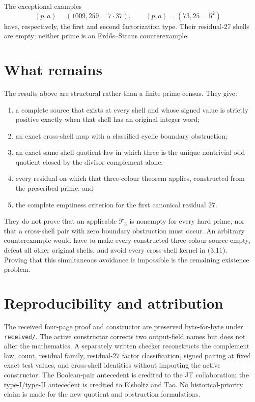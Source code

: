 The exceptional examples
\[
 (p,a)=(1009,259=7\cdot37),\qquad (p,a)=(73,25=5^2)              \tag{7.5}
\]
have, respectively, the first and second factorization type.  Their residual-27
shells are empty; neither prime is an Erd\H{o}s--Straus counterexample.

\section{What remains}

The results above are structural rather than a finite prime census.  They give:
\begin{enumerate}
\item a complete source that exists at every shell and whose signed value is
strictly positive exactly when that shell has an original integer word;
\item an exact cross-shell map with a classified cyclic boundary obstruction;
\item an exact same-shell quotient law in which three is the unique nontrivial
odd quotient closed by the divisor complement alone;
\item every residual on which that three-colour theorem applies, constructed
from the prescribed prime; and
\item the complete emptiness criterion for the first canonical residual $27$.
\end{enumerate}
They do not prove that an applicable $\mathcal T_3$ is nonempty for every hard
prime, nor that a cross-shell pair with zero boundary obstruction must occur.
An arbitrary counterexample would have to make every constructed three-colour
source empty, defeat all other original shells, and avoid every cross-shell
kernel in (3.11).  Proving that this simultaneous avoidance is impossible is
the remaining existence problem.

\section*{Reproducibility and attribution}

The received four-page proof and constructor are preserved byte-for-byte under
\texttt{received/}.  The active constructor corrects two output-field names but
does not alter the mathematics.  A separately written checker reconstructs the
complement law, count, residual family, residual-27 factor classification,
signed pairing at fixed exact test values, and cross-shell identities without
importing the active constructor.  The Boolean-pair antecedent is credited to
the JT collaboration; the type-I/type-II antecedent is credited to Elsholtz and
Tao.  No historical-priority claim is made for the new quotient and obstruction
formulations.
